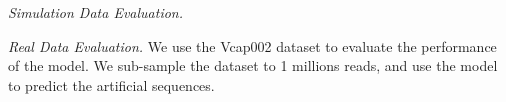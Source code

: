 \documentclass[pdflatex, sn-mathphys-num, lineno]{sn-jnl}%
\theoremstyle{thmstyleone}%
\theoremstyle{thmstyletwo}%
\theoremstyle{thmstylethree}%
\begin{document}
\textit{Simulation Data Evaluation.}

\textit{Real Data Evaluation.} We use the Vcap002 dataset to evaluate the performance of the model.
We sub-sample the dataset to 1 millions reads, and use the model to predict the artificial sequences.





\end{document}
